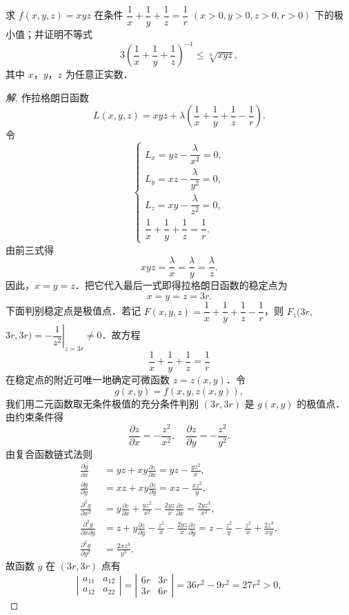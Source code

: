 \begin{example}\label{ex:18-2-1}
求 $f(x,y,z)=xyz$ 在条件 $\dfrac{1}{x}+\dfrac{1}{y}+\dfrac{1}{z}=\dfrac{1}{r}$ $(x>0,y>0,z>0,r>0)$ 下的极小值；并证明不等式
\[
3\left(\frac{1}{x}+\frac{1}{y}+\frac{1}{z}\right)^{-1}\leqslant\sqrt[3]{xyz},
\]
其中 $x$，$y$，$z$ 为任意正实数．
\end{example}

\begin{proof}[解]
作拉格朗日函数
\[
L(x,y,z)=xyz+\lambda\left(\frac{1}{x}+\frac{1}{y}+\frac{1}{z}-\frac{1}{r}\right).
\]
令
\[
\begin{cases}
L_{x}=yz-\dfrac{\lambda}{x^{2}}=0,\\[2mm]
L_{y}=xz-\dfrac{\lambda}{y^{2}}=0,\\[2mm]
L_{z}=xy-\dfrac{\lambda}{z^{2}}=0,\\[2mm]
\dfrac{1}{x}+\dfrac{1}{y}+\dfrac{1}{z}=\dfrac{1}{r}.
\end{cases}
\]
由前三式得
\[
xyz=\frac{\lambda}{x}=\frac{\lambda}{y}=\frac{\lambda}{z}.
\]
因此，$x=y=z$．把它代入最后一式即得拉格朗日函数的稳定点为
\[
x=y=z=3r.
\]
下面判别稳定点是极值点．若记 $F(x,y,z)=\dfrac{1}{x}+\dfrac{1}{y}+\dfrac{1}{z}-\dfrac{1}{r}$，则 $F_{z}(3r,$ $3r,3r)=-\left.\dfrac{1}{z^{2}}\right|_{z=3r}\neq0$．故方程
\[
\frac{1}{x}+\frac{1}{y}+\frac{1}{z}=\frac{1}{r}
\]
在稳定点的附近可唯一地确定可微函数 $z=z(x,y)$．令
\[
g(x,y)=f(x,y,z(x,y)),
\]
我们用二元函数取无条件极值的充分条件判别 $(3r,3r)$ 是 $g(x,y)$ 的极值点．由约束条件得
\[
\frac{\partial z}{\partial x}=-\frac{z^{2}}{x^{2}},\quad\frac{\partial z}{\partial y}=-\frac{z^{2}}{y^{2}}.
\]
由复合函数链式法则
\[
\begin{aligned}
\frac{\partial g}{\partial x}&=yz+xy\frac{\partial z}{\partial x}=yz-\frac{yz^{2}}{x},\\
\frac{\partial g}{\partial y}&=xz+xy\frac{\partial z}{\partial y}=xz-\frac{xz^{2}}{y},\\
\frac{\partial^{2}g}{\partial x^{2}}&=y\frac{\partial z}{\partial x}+\frac{yz^{2}}{x^{2}}-\frac{2yz}{x}\frac{\partial z}{\partial x}=\frac{2yz^{3}}{x^{3}},\\
\frac{\partial^{2}g}{\partial x\partial y}&=z+y\frac{\partial z}{\partial y}-\frac{z^{2}}{x}-\frac{2yz}{x}\frac{\partial z}{\partial y}=z-\frac{z^{2}}{y}-\frac{z^{2}}{x}+\frac{2z^{3}}{xy},\\
\frac{\partial^{2}g}{\partial y^{2}}&=\frac{2xz^{3}}{y^{3}}.
\end{aligned}
\]
故函数 $g$ 在 $(3r,3r)$ 点有
\[
\left|\begin{array}{cc}a_{11}&a_{12}\\ a_{12}&a_{22}\end{array}\right|=\left|\begin{array}{cc}6r&3r\\ 3r&6r\end{array}\right|=36r^{2}-9r^{2}=27r^{2}>0,
\]
\end{proof}
